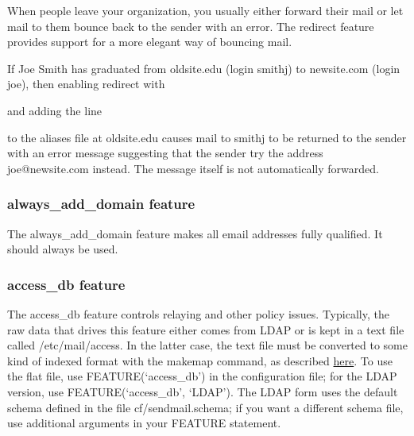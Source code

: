 When people leave your organization, you usually either forward their
mail or let mail to them bounce back to the sender with an error. The
{redirect} feature provides support for a more elegant way of bouncing
mail.

If Joe Smith has graduated from oldsite.edu (login smithj) to
newsite.com (login joe), then enabling {redirect} with


and adding the line


to the {aliases} file at oldsite.edu causes mail to smithj to be
returned to the sender with an error message suggesting that the sender
try the address joe@newsite.com instead. The message itself is not
automatically forwarded.

\subsubsection[{always\_add\_domain}
feature]{\texorpdfstring{\protect\hypertarget{part0026_split_034.htmlux5cux23_idTextAnchor1076}{}{}\protect\hypertarget{part0026_split_034.htmlux5cux23_idIndexMarker2522}{}{}{always\_add\_domain}
feature}{always\_add\_domain feature}}

The {always\_add\_domain} feature makes all email addresses fully
qualified. It should always be used.

\subsubsection[
feature]{\texorpdfstring{\protect\hypertarget{part0026_split_034.htmlux5cux23_idTextAnchor1077}{}{}\protect\hypertarget{part0026_split_034.htmlux5cux23_idIndexMarker2523}{}{}{\protect\hypertarget{part0026_split_034.htmlux5cux23_idTextAnchor1078}{}{}access\_db}
feature}{access\_db feature}}

The {access\_db} feature controls relaying and other policy issues.
Typically, the raw data that drives this feature either comes from LDAP
or is kept in a text file called
\protect\hypertarget{part0026_split_034.htmlux5cux23_idIndexMarker2524}{}{}{/etc/mail/access}.
In the latter case, the text file must be converted to some kind of
indexed format with the {makemap} command, as described
\protect\hyperlink{part0026_split_033.htmlux5cux23_idTextAnchor1062}{here}.
To use the flat file, use {FEATURE(`access\_db')} in the configuration
file; for the LDAP version, use {FEATURE(`access\_db', `LDAP'). }The
LDAP form uses the default schema defined in the file
{cf/sendmail.schema}; if you want a different schema file, use
additional arguments in your {FEATURE} statement.

